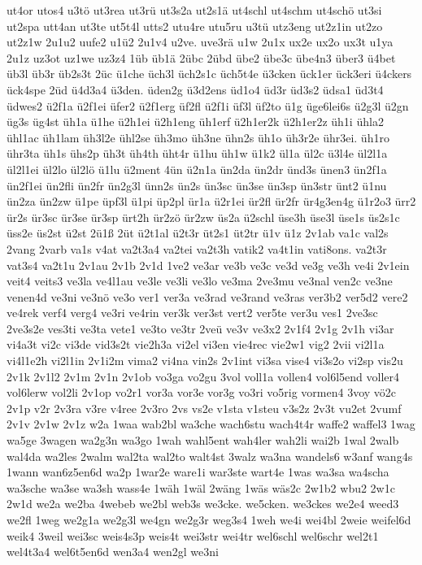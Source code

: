 {ut4or
utos4
u3tö
ut3rea
ut3rü
ut3s2a
ut2s1ä
ut4schl
ut4schm
ut4schö
ut3si
ut2spa
utt4an
ut3te
ut5t4l
utts2
utu4re
utu5ru
u3tü
utz3eng
ut2z1in
ut2zo
ut2z1w
2u1u2
uufe2
u1ü2
2u1v4
u2ve.
uve3rä
u1w
2u1x
ux2e
ux2o
ux3t
u1ya
2u1z
uz3ot
uz1we
uz3z4
1üb
üb1ä
2übc
2übd
übe2
übe3c
übe4n3
über3
ü4bet
üb3l
üb3r
üb2s3t
2üc
ü1che
üch3l
üch2s1c
üch5t4e
ü3cken
ück1er
ück3eri
ü4ckers
ück4spe
2üd
ü4d3a4
ü3den.
üden2g
ü3d2ens
üd1o4
üd3r
üd3s2
üdsa1
üd3t4
üdwes2
ü2f1a
ü2f1ei
üfer2
ü2f1erg
üf2fl
ü2f1i
üf3l
üf2to
ü1g
üge6lei6s
ü2g3l
ü2gn
üg3s
üg4st
üh1a
ü1he
ü2h1ei
ü2h1eng
üh1erf
ü2h1er2k
ü2h1er2z
üh1i
ühla2
ühl1ac
üh1lam
üh3l2e
ühl2se
üh3mo
üh3ne
ühn2s
üh1o
üh3r2e
ühr3ei.
üh1ro
ühr3ta
üh1s
ühs2p
üh3t
üh4th
üht4r
ü1hu
üh1w
ü1k2
ül1a
ül2c
ü3l4e
ül2l1a
ül2l1ei
ül2lo
ül2lö
ü1lu
ü2ment
4ün
ü2n1a
ün2da
ün2dr
ünd3s
ünen3
ün2f1a
ün2f1ei
ün2fli
ün2fr
ün2g3l
ünn2s
ün2s
ün3sc
ün3se
ün3sp
ün3str
ünt2
ü1nu
ün2za
ün2zw
ü1pe
üpf3l
ü1pi
üp2pl
ür1a
ü2r1ei
ür2fl
ür2fr
ür4g3en4g
ü1r2o3
ürr2
ür2s
ür3sc
ür3se
ür3sp
ürt2h
ür2zö
ür2zw
üs2a
ü2schl
üse3h
üse3l
üse1s
üs2s1c
üss2e
üs2st
ü2st
2ü1ß
2üt
ü2t1al
ü2t3r
üt2s1
üt2tr
ü1v
ü1z
2v1ab
va1c
val2s
2vang
2varb
va1s
v4at
va2t3a4
va2tei
va2t3h
vatik2
va4t1in
vati8ons.
va2t3r
vat3s4
va2t1u
2v1au
2v1b
2v1d
1ve2
ve3ar
ve3b
ve3c
ve3d
ve3g
ve3h
ve4i
2v1ein
veit4
veits3
ve3la
ve4l1au
ve3le
ve3li
ve3lo
ve3ma
2ve3mu
ve3nal
ven2c
ve3ne
venen4d
ve3ni
ve3nö
ve3o
ver1
ver3a
ve3rad
ve3rand
ve3ras
ver3b2
ver5d2
vere2
ve4rek
verf4
verg4
ve3ri
ve4rin
ver3k
ver3st
vert2
ver5te
ver3u
ves1
2ve3sc
2ve3s2e
ves3ti
ve3ta
vete1
ve3to
ve3tr
2veü
ve3v
ve3x2
2v1f4
2v1g
2v1h
vi3ar
vi4a3t
vi2c
vi3de
vid3s2t
vie2h3a
vi2el
vi3en
vie4rec
vie2w1
vig2
2vii
vi2l1a
vi4l1e2h
vi2l1in
2v1i2m
vima2
vi4na
vin2s
2v1int
vi3sa
vise4
vi3s2o
vi2sp
vis2u
2v1k
2v1l2
2v1m
2v1n
2v1ob
vo3ga
vo2gu
3vol
voll1a
vollen4
vol6l5end
voller4
vol6lerw
vol2li
2v1op
vo2r1
vor3a
vor3e
vor3g
vo3ri
vo5rig
vormen4
3voy
vö2c
2v1p
v2r
2v3ra
v3re
v4ree
2v3ro
2vs
vs2e
v1sta
v1steu
v3s2z
2v3t
vu2et
2vumf
2v1v
2v1w
2v1z
w2a
1waa
wab2bl
wa3che
wach6stu
wach4t4r
waffe2
waffel3
1wag
wa5ge
3wagen
wa2g3n
wa3go
1wah
wahl5ent
wah4ler
wah2li
wai2b
1wal
2walb
wal4da
wa2les
2walm
wal2ta
wal2to
walt4st
3walz
wa3na
wandels6
w3anf
wang4s
1wann
wan6z5en6d
wa2p
1war2e
ware1i
war3ste
wart4e
1was
wa3sa
wa4scha
wa3sche
wa3se
wa3sh
wass4e
1wäh
1wäl
2wäng
1wäs
wäs2c
2w1b2
wbu2
2w1c
2w1d
we2a
we2ba
4webeb
we2bl
web3s
we3cke.
we5cken.
we3ckes
we2e4
weed3
we2fl
1weg
we2g1a
we2g3l
we4gn
we2g3r
weg3s4
1weh
we4i
wei4bl
2weie
weifel6d
weik4
3weil
wei3sc
weis4s3p
weis4t
wei3str
wei4tr
wel6schl
wel6schr
wel2t1
wel4t3a4
wel6t5en6d
wen3a4
wen2gl
we3ni
}
